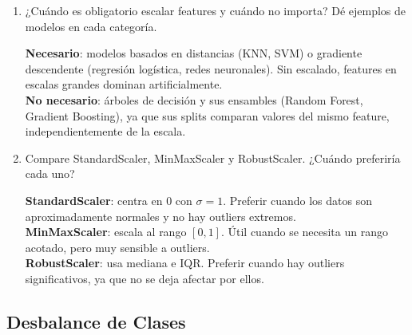 \documentclass[11pt,a4paper]{article}
\begin{document}
\begin{enumerate}[label=\textbf{P\arabic*.}, resume]

\item ¿Cu\'ando es obligatorio escalar features y cu\'ando no importa? D\'e ejemplos de
  modelos en cada categor\'ia.

\begin{answerbox}
\textbf{Necesario}: modelos basados en distancias (KNN, SVM) o gradiente descendente
(regresi\'on log\'istica, redes neuronales). Sin escalado, features en escalas grandes
dominan artificialmente.\\[4pt]
\textbf{No necesario}: \'arboles de decisi\'on y sus ensambles (Random Forest, Gradient
Boosting), ya que sus splits comparan valores del mismo feature, independientemente de
la escala.
\end{answerbox}

\item Compare StandardScaler, MinMaxScaler y RobustScaler. ¿Cu\'ando preferir\'ia cada uno?

\begin{answerbox}
\textbf{StandardScaler}: centra en 0 con $\sigma=1$. Preferir cuando los datos son
aproximadamente normales y no hay outliers extremos.\\
\textbf{MinMaxScaler}: escala al rango $[0,1]$. \'Util cuando se necesita un rango
acotado, pero muy sensible a outliers.\\
\textbf{RobustScaler}: usa mediana e IQR. Preferir cuando hay outliers significativos,
ya que no se deja afectar por ellos.
\end{answerbox}

\end{enumerate}

\subsection{Desbalance de Clases}
\end{document}
